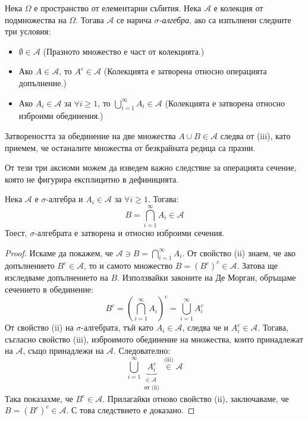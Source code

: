 \begin{keydefn}\label{def:sigma-algebra}
Нека $\Omega$ е пространство от елементарни събития. Нека $\mathcal{A}$ е колекция от подмножества на $\Omega$. Тогава $\mathcal{A}$ се нарича \emph{$\sigma$-алгебра}, ако са изпълнени следните три условия:
\begin{itemize}
    \item[(i)] $\emptyset \in \mathcal{A}$ \quad (Празното множество е част от колекцията.)
    \item[(ii)] Ако $A \in \mathcal{A}$, то $A^c \in \mathcal{A}$ \quad (Колекцията е затворена относно операцията допълнение.)
    \item[(iii)] Ако $A_i \in \mathcal{A}$ за $\forall i \ge 1$, то $\bigcup_{i=1}^{\infty} A_i \in \mathcal{A}$ \quad (Колекцията е затворена относно изброими обединения.)
\end{itemize}
\end{keydefn}

Затвореността за обединение на две множества $A \cup B \in \mathcal{A}$ следва от (iii), като приемем, че останалите множества от безкрайната редица са празни.

От тези три аксиоми можем да изведем важно следствие за операцията сечение, която не фигурира експлицитно в дефиницията.

\begin{cor}
Нека $\mathcal{A}$ е $\sigma$-алгебра и $A_i \in \mathcal{A}$ за $\forall i \ge 1$. Тогава:
\[
B = \bigcap_{i=1}^{\infty} A_i \in \mathcal{A}
\]
Тоест, $\sigma$-алгебрата е затворена и относно изброими сечения.
\end{cor}

\begin{proof}
Искаме да покажем, че $\mathcal{A} \ni B = \bigcap_{i=1}^{\infty} A_i$.
От свойство (ii) знаем, че ако допълнението $B^c \in \mathcal{A}$, то и самото множество $B = (B^c)^c \in \mathcal{A}$. Затова ще изследваме допълнението на $B$. Използвайки законите на Де Морган, обръщаме сечението в обединение:
\[
B^c = \left( \bigcap_{i=1}^{\infty} A_i \right)^c = \bigcup_{i=1}^{\infty} A_i^c
\]
От свойство (ii) на $\sigma$-алгебрата, тъй като $A_i \in \mathcal{A}$, следва че и $A_i^c \in \mathcal{A}$.
Тогава, съгласно свойство (iii), изброимото обединение на множества, които принадлежат на $\mathcal{A}$, също принадлежи на $\mathcal{A}$. Следователно:
\[
\bigcup_{i=1}^{\infty} \underbrace{A_i^c}_{\substack{\in \mathcal{A} \\ \text{от (ii)}}} \stackrel{\text{(iii)}}{\in} \mathcal{A}
\]
Така показахме, че $B^c \in \mathcal{A}$. Прилагайки отново свойство (ii), заключаваме, че $B = (B^c)^c \in \mathcal{A}$. С това следствието е доказано.
\end{proof}

